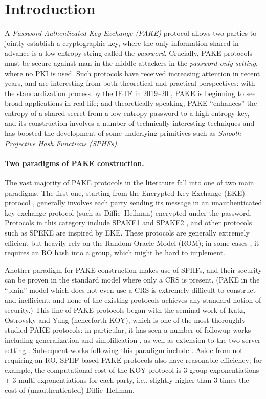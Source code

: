\section{Introduction}
A \emph{Password-Authenticated Key Exchange (PAKE)} protocol allows two parties to jointly establish a cryptographic key, where the only information shared in advance is a low-entropy string called the \emph{password}. Crucially, PAKE protocols must be secure against man-in-the-middle attackers in the \emph{password-only setting}, where no PKI is used. Such protocols have received increasing attention in recent years, and are interesting from both theoretical and practical perspectives: with the standardization process by the IETF in 2019--20 \cite{pake-selection}, PAKE is beginning to see broad applications in real life; and theoretically speaking, PAKE ``enhances'' the entropy of a shared secret from a low-entropy password to a high-entropy key, and its construction involves a number of technically interesting techniques and has boosted the development of some underlying primitives such as \emph{Smooth-Projective Hash Functions (SPHFs)}.

\paragraph{Two paradigms of PAKE construction.}
The vast majority of PAKE protocols in the literature fall into one of two main paradigms. The first one, starting from the Encrypted Key Exchange (EKE) protocol \cite{SP:BelMer92}, generally involves each party sending its message in an unauthenticated key exchange protocol (such as Diffie--Hellman) encrypted under the password. Protocols in this category include SPAKE1 and SPAKE2 \cite{RSA:AbdPoi05}, and other protocols such as SPEKE \cite{Jablon97} are inspired by EKE. These protocols are generally extremely efficient but heavily rely on the Random Oracle Model (ROM); in some cases \cite{SP:BelMer92,Jablon97}, it requires an RO hash into a group, which might be hard to implement.

Another paradigm for PAKE construction makes use of SPHFs, and their security can be proven in the standard model where only a CRS is present. (PAKE in the ``plain'' model which does not even use a CRS is extremely difficult to construct and inefficient, and none of the existing protocols \cite{C:GolLin01,TCC:NguVad04,C:GoyJaiOst10} achieves any standard notion of security.) This line of PAKE protocols began with the seminal work of Katz, Ostrovsky and Yung \cite{EC:KatOstYun01} (henceforth KOY), which is one of the most thoroughly studied PAKE protocols: in particular, it has seen a number of followup works including generalization \cite{EC:GenLin03} and simplification \cite{TCC:Gennaro08,PKC:AbdBenPoi15}, as well as extension to the two-server setting \cite{ACNS:KMTG05}. Subsequent works following this paradigm include \cite{SAC:JiaGon04,CCS:GroKat10,AC:KatVai09a,TCC:KatVai11}. Aside from not requiring an RO, SPHF-based PAKE protocols also have reasonable efficiency; for example, the computational cost of the KOY protocol is 3 group exponentiations + 3 multi-exponentiations for each party, i.e., slightly higher than 3 times the cost of (unauthenticated) Diffie--Hellman.

